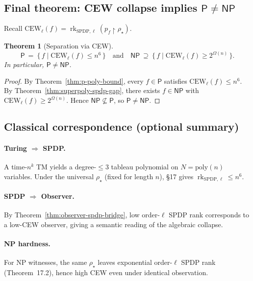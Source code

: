 \documentclass[12pt]{article}
\newtheorem{theorem}{Theorem}
\theoremstyle{definition}
\theoremstyle{definition}
\theoremstyle{remark}
\theoremstyle{remark}
\begin{document}
\subsection{Final theorem: CEW collapse implies $\mathsf{P}\neq\mathsf{NP}$}

Recall $\mathrm{CEW}_\ell(f)=\operatorname{rk}_{\mathrm{SPDP},\ell}(p_f\upharpoonright\rho_\star)$.

\begin{theorem}[Separation via CEW]\label{thm:separation-via-cew}
\[
\mathsf{P}\ =\ \{\,f\mid\mathrm{CEW}_\ell(f)\le n^6\,\}
\quad\text{and}\quad
\mathsf{NP}\ \supseteq\ \{\,f\mid\mathrm{CEW}_\ell(f)\ge 2^{\Omega(n)}\,\}.
\]
In particular, $\mathsf{P}\neq\mathsf{NP}$.
\end{theorem}

\begin{proof}
By Theorem~\ref{thm:p-poly-bound}, every $f\in\mathsf{P}$ satisfies $\mathrm{CEW}_\ell(f)\le n^6$. By Theorem~\ref{thm:superpoly-spdp-gap}, there exists $f\in\mathsf{NP}$ with $\mathrm{CEW}_\ell(f)\ge 2^{\Omega(n)}$. Hence $\mathsf{NP}\not\subseteq\mathsf{P}$, so $\mathsf{P}\neq\mathsf{NP}$.
\end{proof}

\subsection{Classical correspondence (optional summary)}

\paragraph{Turing $\Rightarrow$ SPDP.} A time-$n^k$ TM yields a degree-$\le 3$ tableau polynomial on $N=\mathrm{poly}(n)$ variables. Under the universal $\rho_\star$ (fixed for length $n$), \S17 gives $\operatorname{rk}_{\mathrm{SPDP},\ell}\le n^6$.

\paragraph{SPDP $\Rightarrow$ Observer.} By Theorem~\ref{thm:observer-spdp-bridge}, low order-$\ell$ SPDP rank corresponds to a low-CEW observer, giving a semantic reading of the algebraic collapse.

\paragraph{NP hardness.} For NP witnesses, the same $\rho_\star$ leaves exponential order-$\ell$ SPDP rank (Theorem~17.2), hence high CEW even under identical observation.
\end{document}
